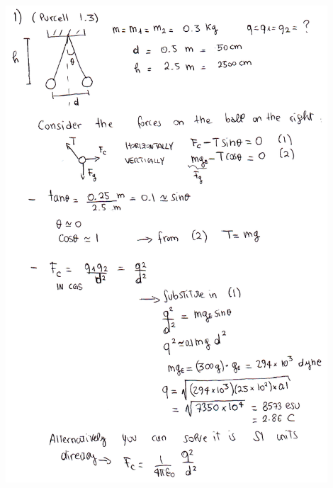 \documentclass{esg8022pset}
\begin{document}
\begin{solution}
  \begin{center}\includegraphics[width=0.9\textwidth]{ps01_sol_01}\end{center}
\end{solution}
\end{document}

